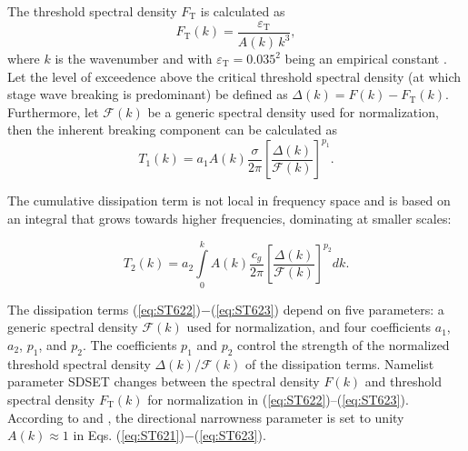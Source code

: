 The threshold spectral density $F_{\mathrm{T}}$ is calculated as
\begin{equation}\label{eq:ST621}
  F_{\mathrm{T}}(k)=\frac{\varepsilon_{\mathrm{T}}}{A(k)\,k^3}  ,
\end{equation}
where $k$ is the wavenumber and with
$\varepsilon_{\mathrm{T}}=0.035^2$ being an empirical constant
\citep{art:Bea07,bk:Bab11}. Let the level of exceedence above the critical
threshold spectral density (at which stage wave breaking is predominant) be
defined as $\Delta(k)=F(k)-F_{\mathrm{T}}(k)$. Furthermore, let
$\mathcal{F}(k)$ be a generic spectral density used for normalization,
then the inherent breaking component can be calculated as
\begin{equation}\label{eq:ST622}
T_1(k)=a_1 A(k)\frac{\sigma}{2\pi} \left [ \frac{\Delta(k)}{\mathcal{F}(k)}
\right ]^{p_1}  .
\end{equation}

\noindent
The cumulative dissipation term is not local in frequency space and is
based on an integral that grows towards higher frequencies, dominating at
smaller scales:

\begin{equation}\label{eq:ST623}
T_2(k)=a_2 \int\limits_0^k A(k) \frac{c_g}{2\pi} \left [
\frac{\Delta(k)}{\mathcal{F}(k)} \right ]^{p_2}\!\!dk .
\end{equation}

\noindent
The dissipation terms (\ref{eq:ST622})$-$(\ref{eq:ST623}) depend on five
parameters: a generic spectral density $\mathcal{F}(k)$ used for
normalization, and four coefficients $a_1$, $a_2$, $p_1$, and $p_2$.  The
coefficients $p_1$ and $p_2$ control the strength of the normalized threshold
spectral density $\Delta(k)/\mathcal{F}(k)$ of the dissipation terms.
Namelist parameter {\code SDSET} changes between the spectral density
$F(k)$ and threshold spectral density $F_{\mathrm{T}}(k)$ for
normalization in (\ref{eq:ST622})--(\ref{eq:ST623}).
According to \citet{art:Bea07} and \citet{art:Bab09}, the directional
narrowness parameter is set to unity $A(k)\approx 1$ in Eqs.
(\ref{eq:ST621})$-$(\ref{eq:ST623}).

